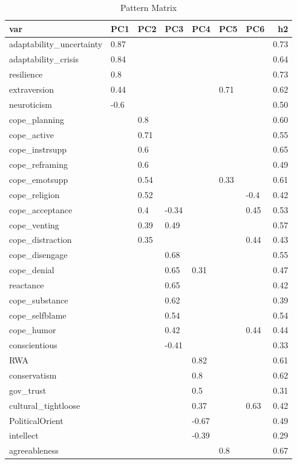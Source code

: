 \documentclass[]{article}
\begin{document}
\begin{table}[H]

\caption{\label{tab:unnamed-chunk-6}Pattern Matrix}
\centering
\fontsize{6}{8}\selectfont
\begin{tabular}[t]{lllllllr}
\toprule
var & PC1 & PC2 & PC3 & PC4 & PC5 & PC6 & h2\\
\midrule
adaptability\_uncertainty & 0.87 &  &  &  &  &  & 0.73\\
adaptability\_crisis & 0.84 &  &  &  &  &  & 0.64\\
resilience & 0.8 &  &  &  &  &  & 0.73\\
extraversion & 0.44 &  &  &  & 0.71 &  & 0.62\\
neuroticism & -0.6 &  &  &  &  &  & 0.50\\
\addlinespace
cope\_planning &  & 0.8 &  &  &  &  & 0.60\\
cope\_active &  & 0.71 &  &  &  &  & 0.55\\
cope\_instrsupp &  & 0.6 &  &  &  &  & 0.65\\
cope\_reframing &  & 0.6 &  &  &  &  & 0.49\\
cope\_emotsupp &  & 0.54 &  &  & 0.33 &  & 0.61\\
\addlinespace
cope\_religion &  & 0.52 &  &  &  & -0.4 & 0.42\\
cope\_acceptance &  & 0.4 & -0.34 &  &  & 0.45 & 0.53\\
cope\_venting &  & 0.39 & 0.49 &  &  &  & 0.57\\
cope\_distraction &  & 0.35 &  &  &  & 0.44 & 0.43\\
cope\_disengage &  &  & 0.68 &  &  &  & 0.55\\
\addlinespace
cope\_denial &  &  & 0.65 & 0.31 &  &  & 0.47\\
reactance &  &  & 0.65 &  &  &  & 0.42\\
cope\_substance &  &  & 0.62 &  &  &  & 0.39\\
cope\_selfblame &  &  & 0.54 &  &  &  & 0.54\\
cope\_humor &  &  & 0.42 &  &  & 0.44 & 0.44\\
\addlinespace
conscientious &  &  & -0.41 &  &  &  & 0.33\\
RWA &  &  &  & 0.82 &  &  & 0.61\\
conservatism &  &  &  & 0.8 &  &  & 0.62\\
gov\_trust &  &  &  & 0.5 &  &  & 0.31\\
cultural\_tightloose &  &  &  & 0.37 &  & 0.63 & 0.42\\
\addlinespace
PoliticalOrient &  &  &  & -0.67 &  &  & 0.49\\
intellect &  &  &  & -0.39 &  &  & 0.29\\
agreeableness &  &  &  &  & 0.8 &  & 0.67\\
\bottomrule
\end{tabular}
\end{table}
\end{document}
